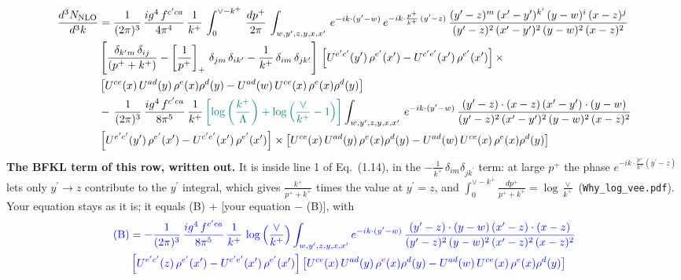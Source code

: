 \documentclass[9pt]{article}
\numberwithin{equation}{section}
\begin{document}
\begin{align}
    \frac{d^{3}N_{\rm NLO}}{d^{3}k} & = \frac{1}{(2\pi)^{3}}\, \frac{ig^{4}\,f^{c'ca}}{4\pi^{4}}\, \frac{1}{k^{+}}\,\int_{0}^{\vee-k^{+}}\, \frac{dp^{+}}{2\pi}\, \int_{w,y',z,y,x,x'}\, e^{-ik\cdot (y'-w)}\, e^{-ik\cdot \frac{p^{+}}{k^{+}}\,(y'-z)}\,\frac{(y'-z)^{m}\,(x'-y')^{k'}\,(y-w)^{i}\,(x-z)^{j}}{(y'-z)^{2}\,(x'-y')^{2}\,(y-w)^{2}\,(x-z)^{2}}\notag \\ & \left[\frac{\delta_{k'm}\,\delta_{ij}}{(p^{+}+k^{+})}-\left[\frac{1}{p^{+}}\right]_{+}\,\delta_{jm}\,\delta_{ik'}-\frac{1}{k^{+}}\, \delta_{im}\, \delta_{jk'}\right]\, \left[U^{e'c'}(y')\,\rho^{e'}(x')-U^{c'e'}(x')\,\rho^{e'}(x')\right]\times \notag \\ &  \left[U^{ce}(x)\,U^{ad}(y)\,\rho^{e}(x)\rho^{d}(y)-U^{ad}(w)\,U^{ce}(x)\,\rho^{e}(x)\rho^{d}(y)\right]\notag \\ & -\,\frac{1}{(2\pi)^{3}}\, \frac{ig^{4}\,f^{c'ca}}{8\pi^{5}}\, \frac{1}{k^{+}}\,{\color{teal}\left[\log{\left(\frac{k^{+}}{\Lambda}\right)}+\log{\left(\frac{\vee}{k^{+}}-1\right)}\right]} \int_{w,y',z,y,x,x'}\, e^{-ik\cdot (y'-w)}\,\frac{(y'-z)\cdot (x-z)\,(x'-y')\cdot (y-w)}{(y'-z)^{2}\,(x'-y')^{2}\,(y-w)^{2}\,(x-z)^{2}}\notag \\ & \left[U^{e'c'}(y')\,\rho^{e'}(x')-U^{c'e'}(x')\,\rho^{e'}(x')\right]\times  \left[U^{ce}(x)\,U^{ad}(y)\,\rho^{e}(x)\rho^{d}(y)-U^{ad}(w)\,U^{ce}(x)\,\rho^{e}(x)\rho^{d}(y)\right]
\end{align}
{\color{blue}\noindent\textbf{The BFKL term of this row, written out.} It is inside line 1 of Eq.~(1.14), in the $-\frac{1}{k^+}\,\delta_{im}\delta_{jk^\prime}$ term: at large $p^+$ the phase $e^{-ik\cdot\frac{p^+}{k^+}(y^\prime-z)}$ lets only $y^\prime\to z$ contribute to the $y^\prime$ integral, which gives $\frac{k^+}{p^++k^+}$ times the value at $y^\prime=z$, and $\int_0^{\vee-k^+}\frac{dp^+}{p^++k^+}=\log\frac{\vee}{k^+}$ (\texttt{Why\_log\_vee.pdf}). Your equation stays as it is; it equals (B) $+$ [your equation $-$ (B)], with}
\begin{align*}
{\color{blue}\text{(B)}} &= \color{blue}-\frac{1}{(2\pi)^{3}}\, \frac{ig^{4}\,f^{c'ca}}{8\pi^{5}}\, \frac{1}{k^{+}}\,\log{\left(\frac{\vee}{k^{+}}\right)}\int_{w,y',z,y,x,x'} e^{-ik\cdot (y'-w)}\,\frac{(y'-z)\cdot (y-w)\,(x'-z)\cdot (x-z)}{(y'-z)^{2}\,(y-w)^{2}\,(x'-z)^{2}\,(x-z)^{2}}\notag \\
& \color{blue}  \left[U^{e'c'}(z)\,\rho^{e'}(x')-U^{c'e'}(x')\,\rho^{e'}(x')\right]\left[U^{ce}(x)\,U^{ad}(y)\,\rho^{e}(x)\rho^{d}(y)-U^{ad}(w)\,U^{ce}(x)\,\rho^{e}(x)\rho^{d}(y)\right]
\end{align*}
\end{document}
